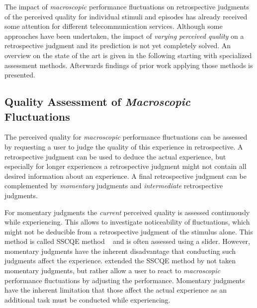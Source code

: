 The impact of \emph{macroscopic} performance fluctuations on retrospective judgments of the perceived quality for individual stimuli and episodes has already received some attention for different telecommunication services.
Although some approaches have been undertaken, the impact of \emph{varying perceived quality} on a retrospective judgment and its prediction is not yet completely solved.
An overview on the state of the art is given in the following starting with specialized assessment methods.
Afterwards findings of prior work applying those methods is presented.

\subsection{Quality Assessment of \emph{Macroscopic} Fluctuations}
The perceived quality for \emph{macroscopic} performance fluctuations can be assessed by requesting a user to judge the quality of this experience in retrospective.
A retrospective judgment can be used to deduce the actual experience, but especially for longer experiences a retrospective judgment might not contain all desired information about an experience.
A final retrospective judgment can be complemented by \emph{momentary} judgments and \emph{intermediate} retrospective judgments.

For momentary judgments the \emph{current} perceived quality is assessed continuously while experiencing.
This allows to investigate noticeability of fluctuations, which might not be deducible from a retrospective judgment of the stimulus alone.
This method is called \ac{SSCQE} method ~\citep[][p. 137]{weiss_temporal_2014} and is often assessed using a slider.
However, momentary judgments have the inherent disadvantage that conducting such judgments affect the experience.
\citet{borowiak_long_2013} extended the \ac{SSCQE} method by not taken momentary judgments, but rather allow a user to react to \emph{macroscopic} performance fluctuations by adjusting the performance.
Momentary judgments have the inherent limitation that those affect the actual experience as an additional task must be conducted while experiencing.

